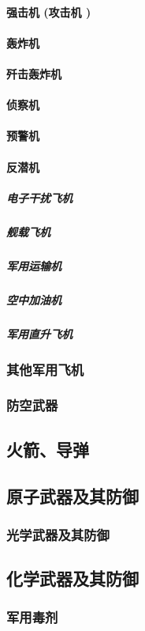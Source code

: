 \documentclass[UTF8]{../ApplicationUniverse}
\begin{document}
            \paragraph{强击机 (攻击机 )}
            \paragraph{轰炸机}
            \paragraph{歼击轰炸机}
            \paragraph{侦察机}
            \paragraph{预警机}
            \paragraph{反潜机}
                \subparagraph{电子干扰飞机}
                \subparagraph{舰载飞机}
                \subparagraph{军用运输机}
                \subparagraph{空中加油机}
                \subparagraph{军用直升飞机}
            \subsubsection{其他军用飞机}
        \subsubsection{防空武器}
    \subsection{火箭、导弹}
    \subsection{原子武器及其防御}
        \subsubsection{光学武器及其防御}
    \subsection{化学武器及其防御}
        \subsubsection{军用毒剂}
\end{document}
